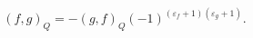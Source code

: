 \begin{equation}
(f,g)_{Q}=-(g,f)_{Q}(-1)^{(\varepsilon_{f}+1)(\varepsilon_{g}+1)}.\label{1.4}%
\end{equation}

